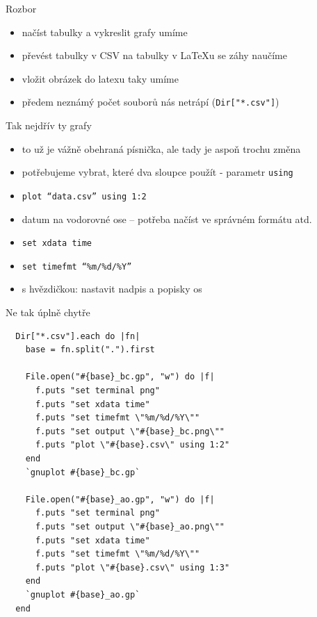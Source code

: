 \documentclass{beamer}
\begin{document}
\begin{frame}{Rozbor}
  \begin{itemize}
    \item načíst tabulky a vykreslit grafy umíme
    \item převést tabulky v CSV na tabulky v LaTeXu se záhy naučíme
    \item vložit obrázek do latexu taky umíme
    \item předem neznámý počet souborů nás netrápí (\texttt{Dir["*.csv"]})
  \end{itemize}
\end{frame}

\begin{frame}{Tak nejdřív ty grafy}
  \begin{itemize}
    \item to už je vážně obehraná písnička, ale tady je aspoň trochu změna
    \item potřebujeme vybrat, které dva sloupce použít - parametr \texttt{using}
    \item \texttt{plot ``data.csv'' using 1:2}
    \item datum na vodorovné ose -- potřeba načíst ve správném formátu atd.
    \item \texttt{set xdata time}
    \item \texttt{set timefmt ``\%m/\%d/\%Y''}
    \item s hvězdičkou: nastavit nadpis a popisky os
  \end{itemize}
\end{frame}

\begin{frame}[fragile]{Ne tak úplně chytře}
  \tiny
\begin{verbatim}
  Dir["*.csv"].each do |fn|
    base = fn.split(".").first

    File.open("#{base}_bc.gp", "w") do |f|
      f.puts "set terminal png"
      f.puts "set xdata time"
      f.puts "set timefmt \"%m/%d/%Y\""
      f.puts "set output \"#{base}_bc.png\""
      f.puts "plot \"#{base}.csv\" using 1:2"
    end
    `gnuplot #{base}_bc.gp`

    File.open("#{base}_ao.gp", "w") do |f|
      f.puts "set terminal png"
      f.puts "set output \"#{base}_ao.png\""
      f.puts "set xdata time"
      f.puts "set timefmt \"%m/%d/%Y\""
      f.puts "plot \"#{base}.csv\" using 1:3"
    end
    `gnuplot #{base}_ao.gp`
  end
\end{verbatim}
\end{frame}
\end{document}
